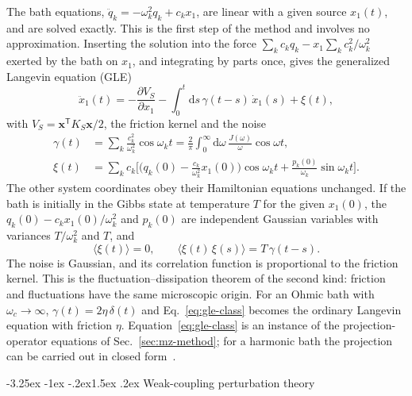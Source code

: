 \documentclass[10pt,a4paper]{article}
\makeatletter
\renewcommand{\subsection}{\@startsection{subsection}{2}{\z@}%
  {-3.25ex \@plus -1ex \@minus -.2ex}{1.5ex \@plus .2ex}%
  {\normalfont\fontsize{15.5pt}{19pt}\selectfont\bfseries}}
\newcommand{\dd}{\mathrm{d}}
\makeatother
\begin{document}
The bath equations, $ \ddot q_k = -\omega_k^2 q_k + c_k x_1 $, are linear with a given source $ x_1(t) $, and are solved exactly.
This is the first step of the method and involves no approximation.
Inserting the solution into the force $ \sum_k c_k q_k - x_1 \sum_k c_k^2/\omega_k^2 $ exerted by the bath on $ x_1 $, and integrating by parts once, gives the generalized Langevin equation (GLE)
\begin{equation}
  \ddot x_1(t) = -\frac{\partial V_S}{\partial x_1} - \int_0^t \dd s \, \gamma(t-s) \, \dot x_1(s) + \xi(t) ,
  \label{eq:gle-class}
\end{equation}
with $ V_S = \mathbf x^{\mathsf T} K_S \mathbf x/2 $, the friction kernel and the noise
\begin{align}
  \gamma(t) &= \sum_k \frac{c_k^2}{\omega_k^2} \cos\omega_k t = \frac{2}{\pi} \int_0^\infty \dd\omega \, \frac{J(\omega)}{\omega} \cos\omega t ,
  \label{eq:friction}\\
  \xi(t) &= \sum_k c_k \Big[ \Big( q_k(0) - \frac{c_k}{\omega_k^2} x_1(0) \Big) \cos\omega_k t + \frac{p_k(0)}{\omega_k} \sin\omega_k t \Big] .
  \label{eq:noise}
\end{align}
The other system coordinates obey their Hamiltonian equations unchanged.
If the bath is initially in the Gibbs state at temperature $ T $ for the given $ x_1(0) $, the $ q_k(0) - c_k x_1(0)/\omega_k^2 $ and $ p_k(0) $ are independent Gaussian variables with variances $ T/\omega_k^2 $ and $ T $, and
\begin{equation}
  \langle \xi(t) \rangle = 0 ,
  \qquad
  \langle \xi(t) \, \xi(s) \rangle = T \, \gamma(t-s) .
  \label{eq:fdt-class}
\end{equation}
The noise is Gaussian, and its correlation function is proportional to the friction kernel.
This is the fluctuation--dissipation theorem of the second kind: friction and fluctuations have the same microscopic origin.
For an Ohmic bath with $ \omega_c \to \infty $, $ \gamma(t) = 2\eta\,\delta(t) $ and Eq.~\eqref{eq:gle-class} becomes the ordinary Langevin equation with friction $ \eta $.
Equation~\eqref{eq:gle-class} is an instance of the projection-operator equations of Sec.~\ref{sec:mz-method}; for a harmonic bath the projection can be carried out in closed form~\cite{Zwanzig1973,Zwanzig2001}.

\subsection{Weak-coupling perturbation theory}
\label{sec:averaging}
\end{document}
